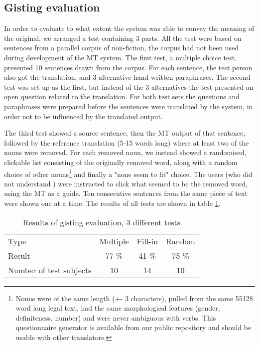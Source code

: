 \subsection{Gisting evaluation}
  
In order to evaluate to what extent the system was able to convey the
meaning of the original, we arranged a test containing 3 parts. All
the test were based on sentences from a parallel corpus of
non-fiction, the corpus had not been used during development of the MT
system. The first test, a multiple choice test, presented 10 sentences
drawn from the corpus. For each sentence, the test person also got the
translation, and 3 alternative hand-written paraphrases. The second
test was set up as the first, but instead of the 3 alternatives the
test presented an open question related to the translation. For both
test sets the questions and paraphrases were prepared before the
sentences were translated by the system, in order not to be influenced
by the translated output.

The third test showed a \sme{} source sentence, then the MT output of
that sentence, followed by the reference translation (5-15 words long)
where at least two of the nouns were removed. For each removed noun,
we instead showed a randomised, clickable list consisting of the
originally removed word, along with a random choice of other
nouns\footnote{Nouns were of the same length (+- 3 characters), pulled
  from the same 55128 word long legal text, had the same morphological
  features (gender, definiteness, number) and were never ambiguous
  with verbs. This questionnaire generator is available from our
  public repository and should be usable with other translators.} and
finally a "none seem to fit" choice. The users (who did not understand
\sme{}) were instructed to click what seemed to be the removed word,
using the MT as a guide. Ten consecutive sentences from the same piece
of text were shown one at a time. The results of all tests are shown
in table \ref{eval}.

\begin{table}[htdp]
\caption{Results of gisting evaluation, 3 different tests}
\begin{center}
\begin{tabular}{lccc}
Type & Multiple & Fill-in & Random \\
Result & 77 \% & 41 \% & 75 \% \\
Number of test subjects & 10 & 14  & 10  \\
\end{tabular}
\end{center}
\label{eval}
\end{table}%



